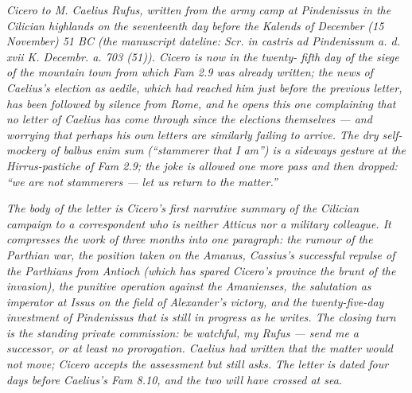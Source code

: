 
\textit{Cicero to M. Caelius Rufus, written from the
army camp at Pindenissus in the Cilician highlands on
the seventeenth day before the Kalends of December
(15 November) 51 BC (the manuscript dateline:
\textit{Scr. in castris ad Pindenissum a. d. xvii K.
Decembr. a. 703 (51)}). Cicero is now in the twenty-
fifth day of the siege of the mountain town from which
\textit{Fam} 2.9 was already written; the news of
Caelius's election as aedile, which had reached him
just before the previous letter, has been followed by
silence from Rome, and he opens this one complaining
that no letter of Caelius has come through since the
elections themselves --- and worrying that perhaps his
own letters are similarly failing to arrive. The dry
self-mockery of \textit{balbus enim sum} (``stammerer
that I am'') is a sideways gesture at the
Hirrus-pastiche of \textit{Fam} 2.9; the joke is
allowed one more pass and then dropped: ``we are not
stammerers --- let us return to the matter.''}

\textit{The body of the letter is Cicero's first
narrative summary of the Cilician campaign to a
correspondent who is neither Atticus nor a military
colleague. It compresses the work of three months
into one paragraph: the rumour of the Parthian war,
the position taken on the Amanus, Cassius's
successful repulse of the Parthians from Antioch
(which has spared Cicero's province the brunt of the
invasion), the punitive operation against the
Amanienses, the salutation as imperator at Issus on
the field of Alexander's victory, and the
twenty-five-day investment of Pindenissus that is
still in progress as he writes. The closing turn is
the standing private commission: be watchful, my
Rufus --- send me a successor, or at least no
prorogation. Caelius had written that the matter would
not move; Cicero accepts the assessment but still
asks. The letter is dated four days before Caelius's
\textit{Fam} 8.10, and the two will have crossed at
sea.}
